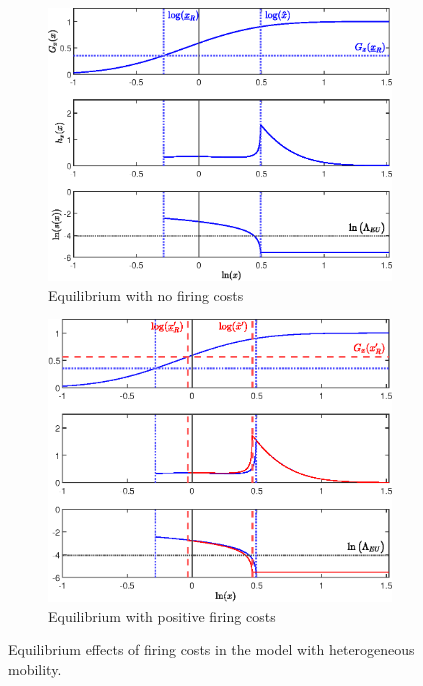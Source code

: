 \documentclass[12pt]{article} %
\theoremstyle{plain}
\theoremstyle{definition}
\begin{document}
	\begin{figure}[!h]
	\begin{subfigure}{0.50\textwidth}
		\includegraphics[width=1\linewidth]{Figure_2a.eps}
		\caption{Equilibrium with no firing costs}
	\end{subfigure}
	\begin{subfigure}{0.50\textwidth}
		\includegraphics[width=1\linewidth]{Figure_2b.eps}
		\caption{Equilibrium with positive firing costs}
	\end{subfigure}
	\caption{Equilibrium effects of firing costs in the model with heterogeneous mobility.}

\end{figure}
\end{document}
